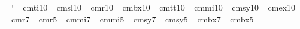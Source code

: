 =`\- %
\font\tenit@=cmti10 %
\font\tensl@=cmsl10 %
\font\tenrm@=cmr10 %
\font\tenbf@=cmbx10 %
\font\tentt@=cmtt10 %
\font\teni@=cmmi10 %
\font\tensy@=cmsy10 %
\font\tenex@=cmex10 %
\font\sevenrm@=cmr7 %
\font\fiverm@=cmr5 %
\font\seveni@=cmmi7 %
\font\fivei@=cmmi5 %
\font\sevensy@=cmsy7 %
\font\fivesy@=cmsy5 %
\font\sevenbf@=cmbx7 %
\font\fivebf@=cmbx5 %

\long{}
\long{}
\long{}
\long{}
\long{}

\def\alinhaesquerda{\rightskip 0em plus 2em \leftskip 0pt \spaceskip.3333em%
     \xspaceskip.5em\relax}
\def\alinhadireita{\leftskip 0em plus 2em \rightskip0pt \spaceskip.3333em%
     \xspaceskip.5em\relax}
\def\alinhacentro{\rightskip 0em plus 2em \leftskip 0em plus 2em%
                  \spaceskip.3333em \xspaceskip.5em\relax}
\def\alinhanormal{\leftskip0pt\rightskip0pt\spaceskip0pt\xspaceskip0pt\relax}

\nonstopmode

\def\maiusculo{\uppercase}
\def\minusculo{\lowercase}

\def\ano{\the\year}
\def\mes{\the\month}
\def\dia{\the\day}

\def\insere#1{}

\def\pagina{\the\pageno@}

